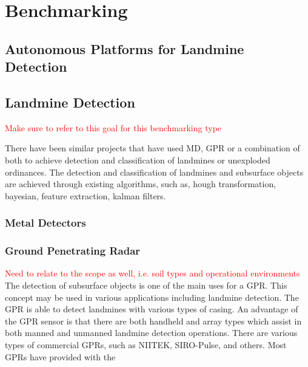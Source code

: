 \documentclass[main.tex]{subfiles}
\begin{document}
\chapter{Benchmarking}

\section{Autonomous Platforms for Landmine Detection}

\section{Landmine Detection}
\textcolor{red}{Make sure to refer to this goal for this benchmarking type}

There have been similar projects that have used MD, GPR or a  combination of both to achieve detection and classification of landmines or unexploded ordinances. The detection and classification of landmines and subsurface objects are achieved through existing algorithms, such as, hough transformation, bayesian, feature extraction, kalman filters. 

\subsection{Metal Detectors}

\subsection{Ground Penetrating Radar}
\textcolor{red}{Need to relate to the scope as well, i.e. soil types and operational environments\\}
The detection of subsurface objects is one of the main uses for a GPR. This concept may be used in various applications including landmine detection. The GPR is able to detect landmines with various types of casing. An advantage of the GPR sensor is that there are both handheld and array types which assist in both manned and unmanned landmine detection operations. There are various types of commercial GPRs, such as NIITEK, SIRO-Pulse, and others. Most GPRs have provided with the 
\end{document}
